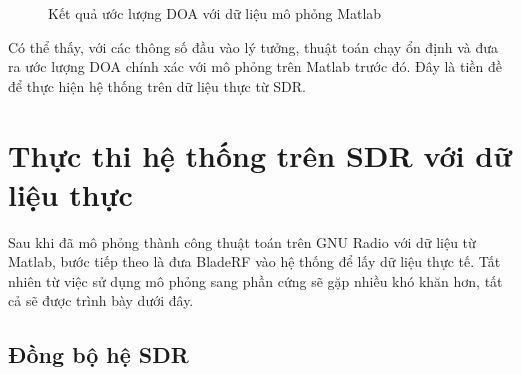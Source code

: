 {\begin{figure}[h]
{}
\hfill
{}
\hfill
\caption{Kết quả ước lượng DOA với dữ liệu mô phỏng Matlab}
\label{fig:simulation2}
\end{figure}

Có thể thấy, với các thông số đầu vào lý tưởng, thuật toán chạy ổn định và đưa ra ước lượng DOA chính xác với mô phỏng trên Matlab trước đó. Đây là tiền đề để thực hiện hệ thống trên dữ liệu thực từ SDR.

\section{Thực thi hệ thống trên SDR với dữ liệu thực}

Sau khi đã mô phỏng thành công thuật toán trên GNU Radio với dữ liệu từ Matlab, bước tiếp theo là đưa BladeRF vào hệ thống để lấy dữ liệu thực tế. Tất nhiên từ việc sử dụng mô phỏng sang phần cứng sẽ gặp nhiều khó khăn hơn, tất cả sẽ được trình bày dưới đây.

\subsection{Đồng bộ hệ SDR}

}
